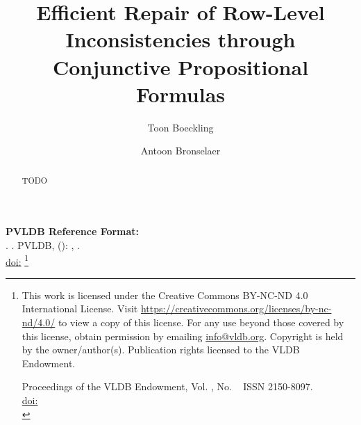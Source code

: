 \title{Efficient Repair of Row-Level Inconsistencies through Conjunctive Propositional Formulas}

\author{Toon Boeckling}

\author{Antoon Bronselaer}

\begin{abstract}
    TODO
\end{abstract}

\maketitle

\pagestyle{\vldbpagestyle}
\begingroup\small\noindent\raggedright\textbf{PVLDB Reference Format:}\\
\vldbauthors. \vldbtitle. PVLDB, \vldbvolume(\vldbissue): \vldbpages, \vldbyear.\\
\href{https://doi.org/\vldbdoi}{doi:\vldbdoi}
\endgroup
\begingroup
\renewcommand\thefootnote{}\footnote{\noindent
This work is licensed under the Creative Commons BY-NC-ND 4.0 International License. Visit \url{https://creativecommons.org/licenses/by-nc-nd/4.0/} to view a copy of this license. For any use beyond those covered by this license, obtain permission by emailing \href{mailto:info@vldb.org}{info@vldb.org}. Copyright is held by the owner/author(s). Publication rights licensed to the VLDB Endowment. \\
\raggedright Proceedings of the VLDB Endowment, Vol. \vldbvolume, No. \vldbissue\ %
ISSN 2150-8097. \\
\href{https://doi.org/\vldbdoi}{doi:\vldbdoi} \\
}\addtocounter{footnote}{-1}\endgroup

